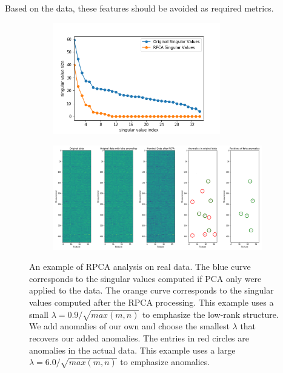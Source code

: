 \documentclass[conference]{IEEEtran}
\begin{document}
Based on the data, these features should be avoided as required metrics.



\begin{figure}
\begin{subfigure}{.5\textwidth}
    \centering
    \includegraphics[width=0.8\textwidth]{images/new_7-26-2020/real_data_svd.png}
    \label{fig:real_data_rank}
\end{subfigure}
\begin{subfigure}{.5\textwidth}
    \centering
    \includegraphics[width=1.0\textwidth]{images/new_7-26-2020/real_data.png}
    \label{fig:real_data_anomalie}
\end{subfigure}
    \caption{An example of RPCA analysis on real data.  The blue curve corresponds to the singular values computed if PCA only were applied to the data.  The orange curve corresponds to the singular values computed after the RPCA processing.  This example uses a small $\lambda=0.9/\sqrt{max(m,n)}$ to emphasize the low-rank structure. 
    We add anomalies of our own and choose the smallest $\lambda$ that recovers our added anomalies.  The entries in red circles are anomalies in the actual data. This example uses a large $\lambda=6.0/\sqrt{max(m,n)}$ to emphasize anomalies. }
    \label{fig:real_data}
\end{figure}
\end{document}
